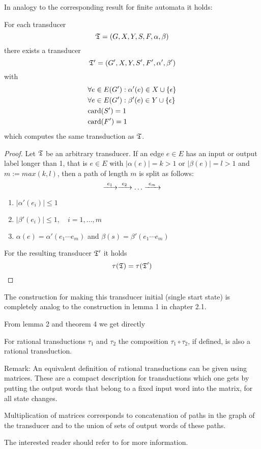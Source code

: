 In analogy to the corresponding result for finite automata it holds:

\begin{lemma}
For each transducer
\[\mbox{$\mathfrak{T}$} = (G, X, Y, S, F, \alpha, \beta)\] there exists a
transducer \[\mbox{$\mathfrak{T'}$} = (G', X, Y, S', F', \alpha', \beta')\] with
\begin{eqnarray*}
& \forall e \in E(G'): \alpha'(e) \in X \cup \mbox{$\{\epsilon\}$} \\
& \forall e \in E(G'): \beta'(e) \in Y \cup \mbox{$\{\epsilon\}$} \\
& \mathrm{card}({S'}) = 1 \\
& \mathrm{card}({F'}) = 1
\end{eqnarray*}
which computes the same transduction as $\mbox{$\mathfrak{T}$}$.
\end{lemma}

\begin{proof}
Let $\mbox{$\mathfrak{T}$}$ be an arbitrary transducer. If an edge $e \in E$ has an
input or output label longer than 1, that is $e \in E$ with $|\alpha(e)| = k >
1$ or $|\beta(e)| = l > 1$ and $m := max(k, l)$, then a path of length $m$ is
split as follows:
\[ \xrightarrow{\ {e_1}\ } \xrightarrow{\ {e_2}\ } \ldots \xrightarrow{\ {e_m}\ } \]

\begin{enumerate}
  \item $|\alpha'(e_i)| \leq 1$
  \item $|\beta'(e_i)| \leq 1,\quad i = 1,\ldots,m$
  \item $\alpha(e) = \alpha'(e_1 \cdots e_m)$ and $\beta(s) = \beta'(e_1
  \cdots e_m)$
\end{enumerate}

For the resulting transducer $\mbox{$\mathfrak{T'}$}$ it holds 
\[ \tau(\mbox{$\mathfrak{T}$}) = \tau(\mbox{$\mathfrak{T}$}') \]
\end{proof}

The construction for making this transducer initial (single start state) is
completely analog to the construction in lemma 1 in chapter 2.1.

From lemma 2 and theorem 4 we get directly

\begin{theorem} For rational transductions $\tau_1$ and $\tau_2$ the composition 
$\tau_1 \circ \tau_2$, if defined, is also a rational transduction.
\end{theorem}

Remark: An equivalent definition of rational transductions can be given using
matrices. These are a compact description for transductions which one gets by
putting the output words that belong to a fixed input word into the matrix, for
all state changes.

Multiplication of matrices corresponds to concatenation of paths in the graph of
the transducer and to the union of sets of output words of these paths.

The interested reader should refer to \cite{Berstel79} for more information.

